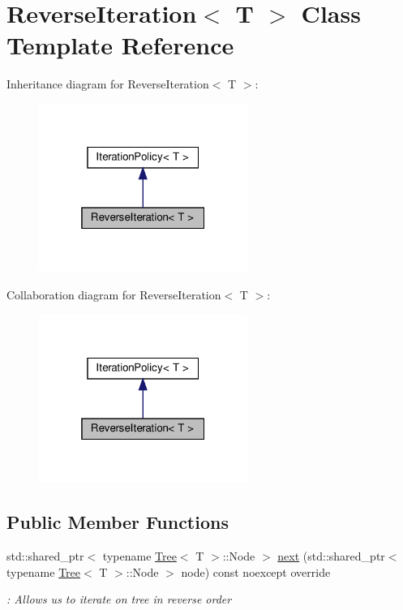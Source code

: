 \hypertarget{classReverseIteration}{}\section{Reverse\+Iteration$<$ T $>$ Class Template Reference}
\label{classReverseIteration}


Inheritance diagram for Reverse\+Iteration$<$ T $>$\+:\nopagebreak
\begin{figure}[H]
\begin{center}
\leavevmode
\includegraphics[width=193pt]{classReverseIteration__inherit__graph}
\end{center}
\end{figure}


Collaboration diagram for Reverse\+Iteration$<$ T $>$\+:\nopagebreak
\begin{figure}[H]
\begin{center}
\leavevmode
\includegraphics[width=193pt]{classReverseIteration__coll__graph}
\end{center}
\end{figure}
\subsection*{Public Member Functions}
\begin{DoxyCompactItemize}
\item 
std\+::shared\+\_\+ptr$<$ typename \hyperlink{classTree}{Tree}$<$ T $>$\+::Node $>$ \hyperlink{classReverseIteration_a3ca61dfcdf068fcc2905106a800c96fb}{next} (std\+::shared\+\_\+ptr$<$ typename \hyperlink{classTree}{Tree}$<$ T $>$\+::Node $>$ node) const noexcept override
\begin{DoxyCompactList}\small\item\em \+: Allows us to iterate on tree in reverse order \end{DoxyCompactList}\end{DoxyCompactItemize}


